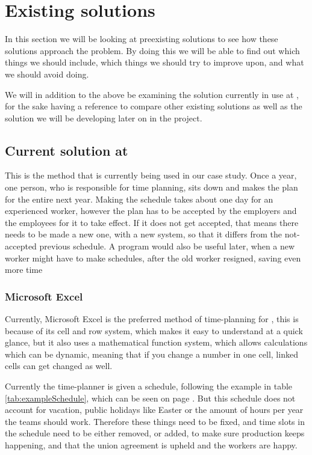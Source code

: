 \section{Existing solutions}
In this section we will be looking at preexisting solutions to see how these solutions approach the problem. By doing this we will be able to find out which things we should include, which things we should try to improve upon, and what we should avoid doing.

We will in addition to the above be examining the solution currently in use at \siemens, for the sake having a reference to compare other existing solutions as well as the solution we will be developing later on in the project.

\subsection{Current solution at \siemens}
This is the method that is currently being used in our case study. Once a year, one person, who is responsible for time planning, sits down and makes the plan for the entire next year. Making the schedule takes about one day for an experienced worker, however the plan has to be accepted by the employers and the employees for it to take effect. If it does not get accepted, that means there needs to be made a new one, with a new system, so that it differs from the not-accepted previous schedule. A program would also be useful later, when a new worker might have to make schedules, after the old worker resigned, saving even more time



\subsubsection{Microsoft Excel}
Currently, Microsoft Excel is the preferred method of time-planning for \siemens, this is because of its cell and row system, which makes it easy to understand at a quick glance, but it also uses a mathematical function system, which allows calculations which can be dynamic, meaning that if you change a number in one cell, linked cells can get changed as well.

Currently the time-planner is given a schedule, following the example in table \ref{tab:exampleSchedule}, which can be seen on page \pageref{tab:exampleSchedule}. But this schedule does not account for vacation, public holidays like Easter or the amount of hours per year the teams should work. Therefore these things need to be fixed, and time slots in the schedule need to be either removed, or added, to make sure production keeps happening, and that the union agreement is upheld and the workers are happy.

